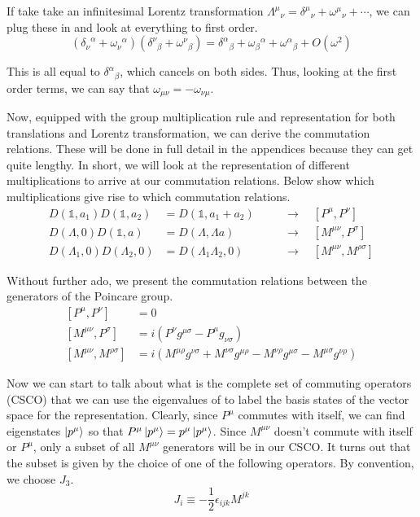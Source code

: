 \documentclass[12pt]{article}
\begin{document}
If take take an infinitesimal Lorentz transformation ${\Lambda^\mu}_\nu={\delta^\mu}_\nu+{\omega^\mu}_\nu+\cdots$, we can plug these in and look at everything to first order.
\begin{equation}
    ({\delta_\nu}^\alpha+{\omega_\nu}^\alpha)({\delta^\nu}_\beta+{\omega^\nu}_\beta)={\delta^\alpha}_\beta+{\omega_\beta}^\alpha +{\omega^\alpha}_\beta+O(\omega^2)
\end{equation}

This is all equal to ${\delta^\alpha}_\beta$, which cancels on both sides. Thus, looking at the first order terms, we can say that $\omega_{\mu\nu}=-\omega_{\nu\mu}$.

Now, equipped with the group multiplication rule and representation for both translations and Lorentz transformation, we can derive the commutation relations. These will be done in full detail in the appendices because they can get quite lengthy. In short, we will look at the representation of different multiplications to arrive at our commutation relations. Below show which multiplications give rise to which commutation relations.
\begin{equation}
\begin{alignedat}{2}
    D(\mathbb{1},a_1)D(\mathbb{1},a_2)&=D(\mathbb{1},a_1+a_2)\quad &&\rightarrow \quad [P^\mu,P^\nu] \\
    D(\Lambda,0)D(\mathbb{1},a)&=D(\Lambda,\Lambda a) &&\rightarrow \quad [M^{\mu\nu},P^\sigma] \\
    D(\Lambda_1,0)D(\Lambda_2,0)&=D(\Lambda_1\Lambda_2,0) &&\rightarrow \quad [M^{\mu\nu},M^{\rho\sigma}]
\end{alignedat}
\end{equation}

Without further ado, we present the commutation relations between the generators of the Poincare group.
\begin{equation}
\begin{aligned}
    [P^\mu,P^\nu]&=0 \\
    [M^{\mu\nu},P^\sigma] &= i(P^\nu g^{\mu\sigma}-P^\mu g_{\nu\sigma})\\
    [M^{\mu\nu},M^{\rho\sigma}] &= i(M^{\mu\rho}g^{\nu\sigma}+M^{\nu\sigma}g^{\mu\rho}-M^{\nu\rho}g^{\mu\sigma}-M^{\mu\sigma}g^{\nu\rho})
\end{aligned}
\end{equation}

Now we can start to talk about what is the complete set of commuting operators (CSCO) that we can use the eigenvalues of to label the basis states of the vector space for the representation. Clearly, since $P^\mu$ commutes with itself, we can find eigenstates $\ket{p^\mu}$ so that $P^\mu\ket{p^\mu}=p^\mu\ket{p^\mu}$. Since $M^{\mu\nu}$ doesn't commute with itself or $P^\mu$, only a subset of all $M^{\mu\nu}$ generators will be in our CSCO. It turns out that the subset is given by the choice of one of the following operators. By convention, we choose $J_3$.
\begin{equation}
    J_i\equiv-\frac{1}{2}\epsilon_{ijk}M^{jk}
\end{equation}
\end{document}

